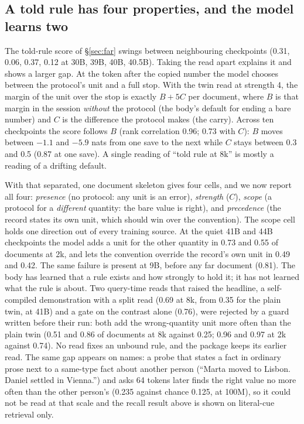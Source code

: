 \documentclass[11pt]{article}
\begin{document}
\subsection{A told rule has four properties, and the model learns two}
\label{sec:axes}
The told-rule score of \S\ref{sec:far} swings between neighbouring checkpoints (0.31, 0.06, 0.37, 0.12 at 30B, 39B, 40B, 40.5B). Taking the read apart explains it and shows a larger gap. At the token after the copied number the model chooses between the protocol's unit and a full stop. With the twin read at strength 4, the margin of the unit over the stop is exactly $B + 5C$ per document, where $B$ is that margin in the session \emph{without} the protocol (the body's default for ending a bare number) and $C$ is the difference the protocol makes (the carry). Across ten checkpoints the score follows $B$ (rank correlation 0.96; 0.73 with $C$): $B$ moves between $-1.1$ and $-5.9$ nats from one save to the next while $C$ stays between 0.3 and 0.5 (0.87 at one save). A single reading of ``told rule at 8k'' is mostly a reading of a drifting default.

With that separated, one document skeleton gives four cells, and we now report all four: \emph{presence} (no protocol: any unit is an error), \emph{strength} ($C$), \emph{scope} (a protocol for a \emph{different} quantity: the bare value is right), and \emph{precedence} (the record states its own unit, which should win over the convention). The scope cell holds one direction out of every training source. At the quiet 41B and 44B checkpoints the model adds a unit for the other quantity in 0.73 and 0.55 of documents at 2k, and lets the convention override the record's own unit in 0.49 and 0.42. The same failure is present at 9B, before any far document (0.81). The body has learned that a rule exists and how strongly to hold it; it has not learned what the rule is about. Two query-time reads that raised the headline, a self-compiled demonstration with a split read (0.69 at 8k, from 0.35 for the plain twin, at 41B) and a gate on the contrast alone (0.76), were rejected by a guard written before their run: both add the wrong-quantity unit more often than the plain twin (0.51 and 0.86 of documents at 8k against 0.25; 0.96 and 0.97 at 2k against 0.74). No read fixes an unbound rule, and the package keeps its earlier read. The same gap appears on names: a probe that states a fact in ordinary prose next to a same-type fact about another person (``Marta moved to Lisbon. Daniel settled in Vienna.'') and asks 64 tokens later finds the right value no more often than the other person's (0.235 against chance 0.125, at 100M), so it could not be read at that scale and the recall result above is shown on literal-cue retrieval only.
\end{document}
